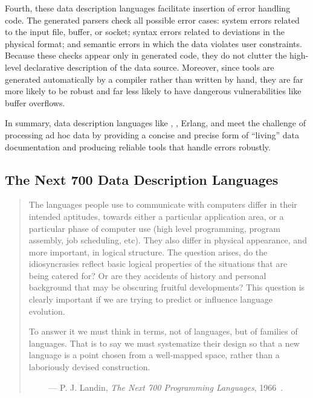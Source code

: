 Fourth, these data description languages 
facilitate insertion of error handling code. 
The generated parsers check all possible
error cases: system errors related to the input file, buffer, or
socket; syntax errors related to deviations in the physical format;
and semantic errors in which the data violates user
constraints. Because these checks appear only in generated code, they
do not clutter the high-level declarative description of the data
source. Moreover, since tools are generated automatically by a
compiler rather than written by hand, they are far more likely to be
robust and far less likely to have dangerous vulnerabilities like
buffer overflows. 

In summary, data description languages like \datascript{},
\packettypes{}, Erlang, and \pads{} meet the challenge of
processing ad hoc data by providing a concise and precise form of
``living'' data documentation and producing reliable tools that handle
errors robustly.


\subsection{The Next 700 Data Description Languages}

\begin {quote}
The languages people use to communicate with computers differ in their intended aptitudes, towards either a
particular application area, or a particular phase of computer use (high level programming, program assembly,
job scheduling, etc). They also differ in physical appearance, and more important, in logical structure. The question arises, do the idiosyncrasies reflect basic logical
properties of the situations that are being catered for?
Or are they accidents of history and personal background
that may be obscuring fruitful developments? This
question is clearly important if we are trying to predict or
influence language evolution.

To answer it we must think in terms, not of languages,
but of families of languages. That is to say we must
systematize their design so that a new language is a point
chosen from a well-mapped space, rather than a laboriously
devised construction.

$\qquad$ --- P. J. Landin, {\em The Next 700 Programming Languages}, 
1966~\cite{landin:700}.
\end{quote}


